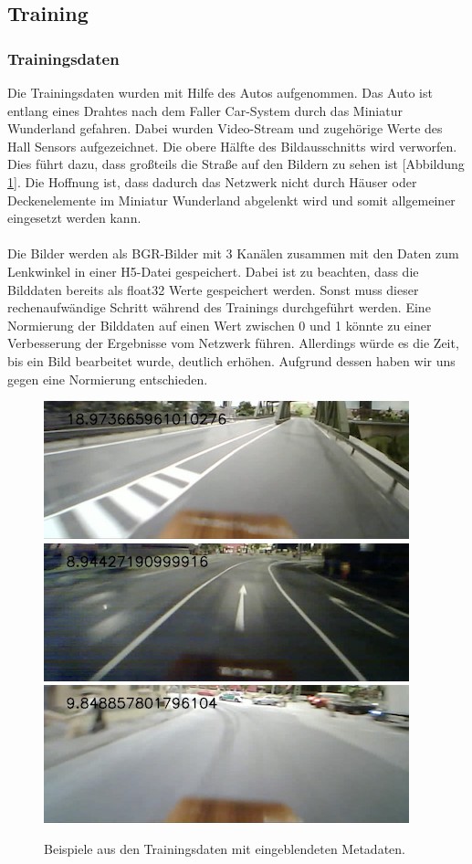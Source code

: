 \documentclass[a4paper, 12pt]{scrartcl}
\begin{document}
			\subsection{Training}
				\subsubsection{Trainingsdaten}
				Die Trainingsdaten wurden mit Hilfe des Autos aufgenommen. Das Auto ist entlang eines Drahtes nach dem Faller Car-System durch das Miniatur Wunderland gefahren. Dabei wurden Video-Stream und zugehörige Werte des Hall Sensors aufgezeichnet. Die obere Hälfte des Bildausschnitts wird verworfen. Dies führt dazu, dass großteils die Straße auf den Bildern zu sehen ist [Abbildung \ref{fig:trainigsdaten}]. Die Hoffnung ist, dass dadurch das Netzwerk nicht durch Häuser oder Deckenelemente im Miniatur Wunderland abgelenkt wird und somit allgemeiner eingesetzt werden kann. \\ \\
				Die Bilder werden als BGR-Bilder mit 3 Kanälen zusammen mit den Daten zum Lenkwinkel in einer H5-Datei gespeichert. Dabei ist zu beachten, dass die Bilddaten bereits als float32 Werte gespeichert werden. Sonst muss dieser rechenaufwändige Schritt während des Trainings durchgeführt werden. Eine Normierung der Bilddaten auf einen Wert zwischen 0 und 1 könnte zu einer Verbesserung der Ergebnisse vom Netzwerk führen. Allerdings würde es die Zeit, bis ein Bild bearbeitet wurde, deutlich erhöhen. Aufgrund dessen haben wir uns gegen eine Normierung entschieden.
				
				\begin{figure}[h!]
				   	 \centering
   					 \includegraphics{Trainingsdaten-1}
					 \includegraphics{Trainingsdaten-2}
					 \includegraphics{Trainingsdaten-3}
  					  \caption{Beispiele aus den Trainingsdaten mit eingeblendeten Metadaten.}
 					   \label{fig:trainigsdaten}
				\end{figure}
				
\end{document}
